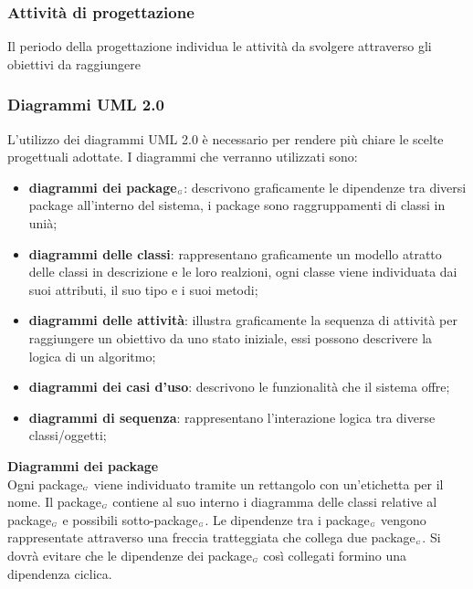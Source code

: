 \subsubsection{Attività di progettazione}\label{ProcessiPrimariProgettazioneAttivita}
Il periodo della progettazione individua le attività da svolgere attraverso gli obiettivi da raggiungere

\subsubsection{Diagrammi UML 2.0}\label{ProcessiPrimariProgettazioneUML}
L'utilizzo dei diagrammi UML 2.0 è necessario per rendere più chiare le scelte progettuali adottate. I diagrammi che verranno utilizzati sono:
\begin{itemize}
	\item \textbf{diagrammi dei package$_{\scaleto{G}{3pt}}$}: descrivono graficamente le dipendenze tra diversi package all'interno del sistema, i package sono raggruppamenti di classi in unià;
	\item \textbf{diagrammi delle classi}: rappresentano graficamente un modello atratto delle classi in descrizione e le loro realzioni, ogni classe viene individuata dai suoi attributi, il suo tipo e i suoi metodi;
	\item \textbf{diagrammi delle attività}: illustra graficamente la sequenza di attività per raggiungere un obiettivo da uno stato iniziale, essi possono descrivere la logica di un algoritmo; %
	\item \textbf{diagrammi dei casi d'uso}: descrivono le funzionalità che il sistema offre;
	\item \textbf{diagrammi di sequenza}: rappresentano l'interazione logica tra diverse classi/oggetti;
\end{itemize}

\quad\large\textbf{Diagrammi dei package}\\
Ogni package$_{\scaleto{G}{3pt}}$ viene individuato tramite un rettangolo con un'etichetta per il nome. Il package$_{\scaleto{G}{3pt}}$ contiene al suo interno i diagramma delle classi relative al package$_{\scaleto{G}{3pt}}$ e possibili sotto-package$_{\scaleto{G}{3pt}}$. Le dipendenze tra i package$_{\scaleto{G}{3pt}}$ vengono rappresentate attraverso una freccia tratteggiata che collega due package$_{\scaleto{G}{3pt}}$. Si dovrà evitare che le dipendenze dei package$_{\scaleto{G}{3pt}}$ così collegati formino una dipendenza ciclica.

